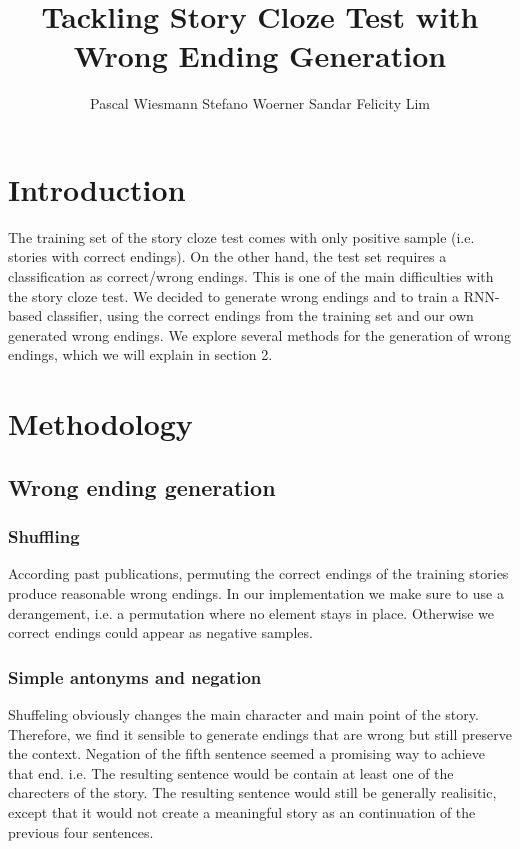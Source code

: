 \documentclass{article}
\title{Tackling Story Cloze Test with Wrong Ending Generation}
\author{Pascal Wiesmann \qquad Stefano Woerner \qquad Sandar Felicity Lim}
\begin{document}

\maketitle


\section{Introduction}

The training set of the story cloze test comes with only positive sample (i.e. stories with correct endings). On the other hand, the test set requires a classification as correct/wrong endings. This is one of the main difficulties with the story cloze test. We decided to generate wrong endings and to train a RNN-based classifier, using the correct endings from the training set and our own generated wrong endings. We explore several methods for the generation of wrong endings, which we will explain in section 2.

\section{Methodology}


\subsection{Wrong ending generation}

\subsubsection{Shuffling} According past publications\cite{top4}, permuting the correct endings of the training stories produce reasonable wrong endings. In our implementation we make sure to use a derangement, i.e. a permutation where no element stays in place. Otherwise we correct endings could appear as negative samples.

\subsubsection{Simple antonyms and negation}

Shuffeling obviously changes the main character and main point of the story. Therefore, we find it sensible to generate endings that are wrong but still preserve the context. Negation of the fifth sentence seemed a promising way to achieve that end. i.e. The resulting sentence would be contain at least one of the charecters of the story. The resulting sentence would still be generally realisitic, except that it would not create a meaningful story as an continuation of the previous four sentences. 
\end{document}
